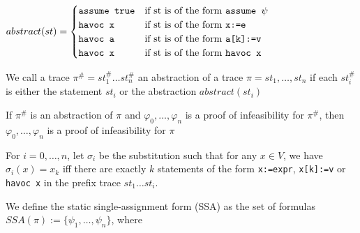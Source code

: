 \documentclass[landscape, a4paper]{article}
\begin{document}
\begin{minipage}[t]{0.2\linewidth}
\begin{betterlist}
		$abstract(st) = \begin{cases}
				\verb|assume true| & \text{if st is of the form } \verb|assume |\psi \\
				\verb|havoc x|     & \text{if st is of the form } \verb|x:=e|        \\
				\verb|havoc a|     & \text{if st is of the form } \verb|a[k]:=v|     \\
				\verb|havoc x|     & \text{if st is of the form } \verb|havoc x|
			\end{cases}$
		\item We call a trace $\pi^\# = st^\#_1 \ldots st^\#_n$ an \alert{abstraction of a trace} $\pi = st_1, \ldots, st_n$ if each $st^\#_i$ is either the statement $st_i$ or the abstraction $abstract(st_i)$
		\begin{betterlist}
			\item If $\pi^\#$ is an abstraction of $\pi$ and $\varphi_0, \ldots , \varphi_n$ is a proof of infeasibility for $\pi^\#$, then $\varphi_0, \ldots , \varphi_n$ is a proof of infeasibility for $\pi$
		\end{betterlist}
		\item For $i = 0, \ldots, n$, let $\sigma_i$ be the substitution such that for any $x \in V$, we have $\sigma_i(x) = x_k$ iff there are exactly $k$ statements of the form \verb|x:=expr|, \verb|x[k]:=v| or \verb|havoc x| in the prefix trace $st_1 \ldots st_i$.

		\color{orange}We define the \alert{static single-assignment form (SSA)} as the set of formulas $SSA(\pi) := \{\psi_1, \ldots, \psi_n\}$, where


\end{betterlist}
\end{minipage}
\end{document}

